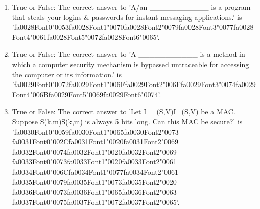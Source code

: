 \documentclass[12pt]{article}
\begin{document}
\begin{enumerate}[label=\arabic*.]
\item True or False: The correct answer to 'A/an \_\_\_\_\_\_\_\_\_\_\_ is a program that steals your logins \& passwords for instant messaging applications.' is '{\csname fa0028Font0\endcsname\char"0053}{\csname fa0028Font1\endcsname\char"0070}{\csname fa0028Font2\endcsname\char"0079}{\csname fa0028Font3\endcsname\char"0077}{\csname fa0028Font4\endcsname\char"0061}{\csname fa0028Font5\endcsname\char"0072}{\csname fa0028Font6\endcsname\char"0065}'.
\item True or False: The correct answer to 'A \_\_\_\_\_\_\_\_\_\_\_ is a method in which a computer security mechanism is bypassed untraceable for accessing the computer or its information.' is '{\csname fa0029Font0\endcsname\char"0072}{\csname fa0029Font1\endcsname\char"006F}{\csname fa0029Font2\endcsname\char"006F}{\csname fa0029Font3\endcsname\char"0074}{\csname fa0029Font4\endcsname\char"006B}{\csname fa0029Font5\endcsname\char"0069}{\csname fa0029Font6\endcsname\char"0074}'.
\item True or False: The correct answer to 'Let I = (S,V)I=(S,V) be a MAC. Suppose S(k,m)S(k,m) is always 5 bits long. Can this MAC be secure?' is '{\csname fa0030Font0\endcsname\char"0059}{\csname fa0030Font1\endcsname\char"0065}{\csname fa0030Font2\endcsname\char"0073} {\csname fa0031Font0\endcsname\char"002C}{\csname fa0031Font1\endcsname\char"0020}{\csname fa0031Font2\endcsname\char"0069} {\csname fa0032Font0\endcsname\char"0074}{\csname fa0032Font1\endcsname\char"0020}{\csname fa0032Font2\endcsname\char"0069} {\csname fa0033Font0\endcsname\char"0073}{\csname fa0033Font1\endcsname\char"0020}{\csname fa0033Font2\endcsname\char"0061} {\csname fa0034Font0\endcsname\char"006C}{\csname fa0034Font1\endcsname\char"0077}{\csname fa0034Font2\endcsname\char"0061} {\csname fa0035Font0\endcsname\char"0079}{\csname fa0035Font1\endcsname\char"0073}{\csname fa0035Font2\endcsname\char"0020} {\csname fa0036Font0\endcsname\char"0073}{\csname fa0036Font1\endcsname\char"0065}{\csname fa0036Font2\endcsname\char"0063} {\csname fa0037Font0\endcsname\char"0075}{\csname fa0037Font1\endcsname\char"0072}{\csname fa0037Font2\endcsname\char"0065}'.
\end{enumerate}
\end{document}
